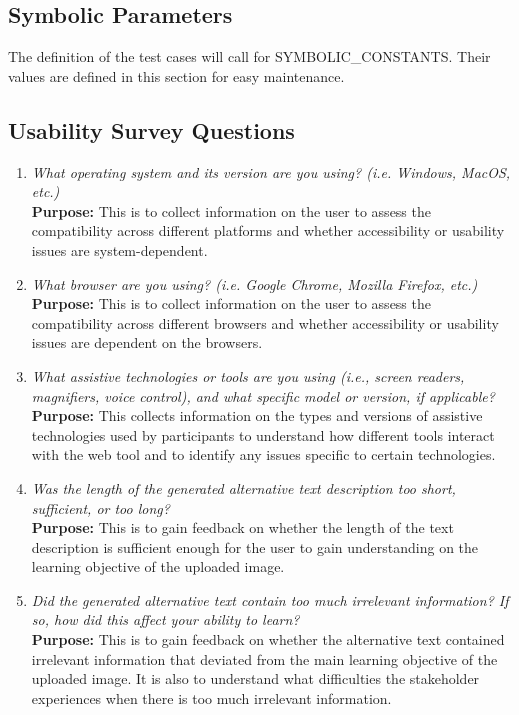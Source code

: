 \documentclass[12pt, titlepage]{article}
\begin{document}
\subsection{Symbolic Parameters}

The definition of the test cases will call for SYMBOLIC\_CONSTANTS.
Their values are defined in this section for easy maintenance.

\subsection{Usability Survey Questions}
\label{appendix:usability}

\begin{enumerate}[label=UA-Q \arabic*., wide=0pt, leftmargin=*]
\item \emph{What operating system and its version are you using?
  (i.e. Windows, MacOS, etc.)}\\[2mm]
  {\bf Purpose:} This is to collect information on the user to assess
  the compatibility across different platforms and
  whether accessibility or usability issues are system-dependent.

\item \emph{What browser are you using? (i.e. Google Chrome, Mozilla
  Firefox, etc.)}\\[2mm]
  {\bf Purpose:} This is to collect information on the user to assess
  the compatibility across different browsers and
  whether accessibility or usability issues are dependent on the browsers.

\item \emph{What assistive technologies or tools are you using (i.e.,
    screen readers, magnifiers, voice control), and what specific model
  or version, if applicable?}\\[2mm]
  {\bf Purpose:} This collects information on the types and versions
  of assistive technologies used by participants to understand how
  different tools interact with the web tool
  and to identify any issues specific to certain technologies.

\item \emph{Was the length of the generated alternative text
  description too short, sufficient, or too long?}\\[2mm]
  {\bf Purpose:} This is to gain feedback on whether the length of
  the text description is sufficient enough
  for the user to gain understanding on the learning objective of the
  uploaded image.

\item \emph{Did the generated alternative text contain too much
    irrelevant information? If so, how did this affect
  your ability to learn?}\\[2mm]
  {\bf Purpose:} This is to gain feedback on whether the alternative
  text contained irrelevant information that deviated
  from the main learning objective of the uploaded image. It is also
  to understand what difficulties the stakeholder experiences
  when there is too much irrelevant information.


\end{enumerate}
\end{document}
